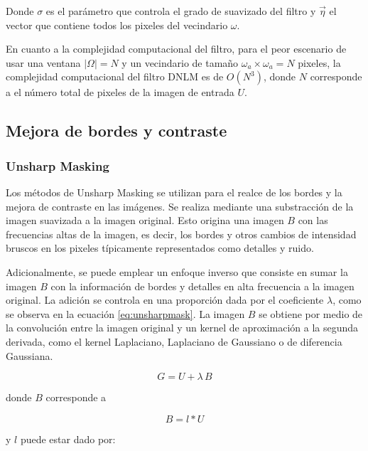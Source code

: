 Donde $\sigma$ es el par\'ametro que controla el grado de suavizado del filtro y $\vec{\eta}$ el vector que contiene todos los pixeles del vecindario $\omega$.

En cuanto a la complejidad computacional del filtro, para el peor escenario de usar una ventana $|\Omega| = N$ y un vecindario de tama\~no $\omega_{a} \times \omega_{a} = N$ pixeles, la complejidad computacional del filtro DNLM es de $O(N^3)$, donde $N$ corresponde a el n\'umero total de pixeles de la imagen de entrada $U$. 



\subsection{Mejora de bordes y contraste}

\subsubsection{Unsharp Masking}
\label{ch:marco_usm}

Los m\'etodos de Unsharp Masking se utilizan para el realce de los bordes y la mejora de contraste en las im\'agenes. Se realiza mediante una substracci\'on de la imagen suavizada a la imagen original. Esto origina una imagen $B$ con las frecuencias altas de la imagen, es decir, los bordes y otros cambios de intensidad bruscos en los pixeles t\'ipicamente representados como detalles y ruido. 

Adicionalmente, se puede emplear un enfoque inverso que consiste en sumar la imagen $B$ con la informaci\'on de bordes y detalles en alta frecuencia a la imagen original. La adici\'on se controla en una proporci\'on dada por el coeficiente $\lambda$, como se observa en la ecuaci\'on \ref{eq:unsharpmask}. La imagen $B$ se obtiene por medio de la convoluci\'on entre la imagen original y un kernel de aproximaci\'on a la segunda derivada, como el kernel Laplaciano, Laplaciano de Gaussiano o de diferencia Gaussiana.

\begin{equation}
\label{eq:unsharpmask}
G=U+\lambda\,B
\end{equation}

donde $B$ corresponde a

\begin{equation}
\label{eq:unsharfilter}
B=l*U
\end{equation}

y $l$ puede estar dado por:

